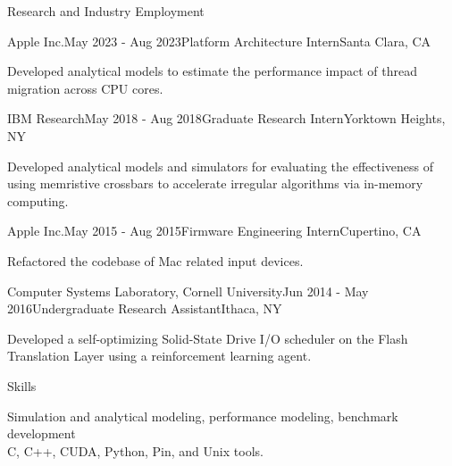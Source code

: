 \documentclass{resume} %
\begin{document}
\begin{rSection}{Research and Industry Employment}
\begin{rSubsection}{Apple Inc.}{May 2023 - Aug 2023}{Platform Architecture Intern}{Santa Clara, CA}

\item Developed analytical models to estimate the performance impact of thread migration across CPU cores.
\end{rSubsection}

\begin{rSubsection}{IBM Research}{May 2018 - Aug 2018}{Graduate Research Intern}{Yorktown Heights, NY}

\item Developed analytical models and simulators for evaluating the effectiveness of using memristive crossbars
to accelerate irregular algorithms via in-memory computing.
\end{rSubsection}

\begin{rSubsection}{Apple Inc.}{May 2015 - Aug 2015}{Firmware Engineering Intern}{Cupertino, CA}

\item Refactored the codebase of Mac related input devices. 
\end{rSubsection}

\begin{rSubsection}{Computer Systems Laboratory, Cornell University}{Jun 2014 - May 2016}{Undergraduate Research Assistant}{Ithaca, NY}

\item Developed a self-optimizing Solid-State Drive I/O scheduler on the Flash Translation Layer using a reinforcement learning agent. 
\end{rSubsection}


\end{rSection}


\begin{rSection}{Skills}

Simulation and analytical modeling, performance modeling, benchmark development \\
C, C++, CUDA, Python, Pin, and Unix tools. \\

\end{rSection}
\end{document}
